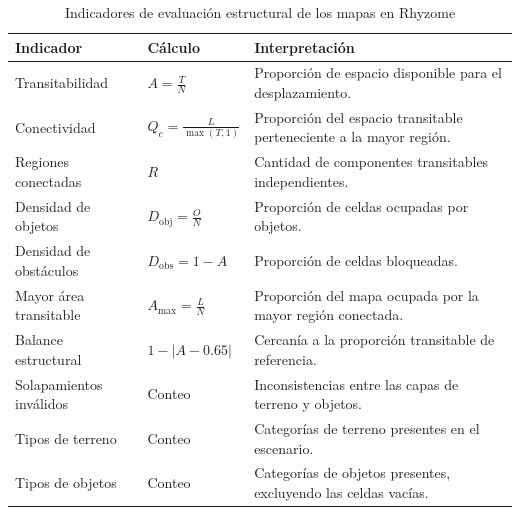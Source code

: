 \begin{table}[htbp]
	\centering
	
	\caption{Indicadores de evaluación estructural de los mapas en Rhyzome}
	\label{tab:metricas_estructurales_v2}
	
	\renewcommand{\arraystretch}{1.6}
	\small
	
	\begin{tabularx}{\textwidth}{
			|>{\raggedright\arraybackslash}p{3.2cm}|
			>{\centering\arraybackslash}p{3.5cm}|
			>{\raggedright\arraybackslash}X|
		}
		
		\hline
		
		\rowcolor{gray!15}
		\textbf{Indicador} &
		\textbf{Cálculo} &
		\textbf{Interpretación} \\ \hline
		
		Transitabilidad &
		$\displaystyle A=\frac{T}{N}$ &
		Proporción de espacio disponible
		para el desplazamiento. \\ \hline
		
		Conectividad &
		$\displaystyle Q_c=\frac{L}{\max(T,1)}$ &
		Proporción del espacio transitable
		perteneciente a la mayor región.
		\\ \hline
		
		Regiones conectadas &
		$R$ &
		Cantidad de componentes transitables
		independientes. \\ \hline
		
		Densidad de objetos &
		$\displaystyle D_{\mathrm{obj}}=\frac{O}{N}$ &
		Proporción de celdas ocupadas
		por objetos. \\ \hline
		
		Densidad de obstáculos &
		$\displaystyle D_{\mathrm{obs}}=1-A$ &
		Proporción de celdas bloqueadas.
		\\ \hline
		
		Mayor área transitable &
		$\displaystyle A_{\max}=\frac{L}{N}$ &
		Proporción del mapa ocupada por
		la mayor región conectada. \\ \hline
		
		Balance estructural &
		$\displaystyle 1-|A-0.65|$ &
		Cercanía a la proporción transitable
		de referencia. \\ \hline
		
		Solapamientos inválidos &
		Conteo &
		Inconsistencias entre las capas
		de terreno y objetos. \\ \hline
		
		Tipos de terreno &
		Conteo &
		Categorías de terreno presentes
		en el escenario. \\ \hline
		
		Tipos de objetos &
		Conteo &
		Categorías de objetos presentes,
		excluyendo las celdas vacías.
		\\ \hline
		
	\end{tabularx}
	
\end{table}

